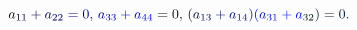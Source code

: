 \documentclass[12pt]{article}
\begin{document}
\makeatletter
\renewcommand*{\@textcolor}[3]{%
  \protect\leavevmode
  \begingroup
    \color#1{#2}#3%
  \endgroup
}
\makeatother
\begin{displaymath}
\mathcolor[RGB]{0,0,15}{a} _ { \mathcolor[RGB]{0,0,30}{1} \mathcolor[RGB]{0,0,45}{1} } \mathcolor[RGB]{0,0,60}{+} \mathcolor[RGB]{0,0,75}{a} _ { \mathcolor[RGB]{0,0,90}{2} \mathcolor[RGB]{0,0,105}{2} } \mathcolor[RGB]{0,0,120}{=} \mathcolor[RGB]{0,0,135}{0} \mathcolor[RGB]{0,0,150}{,} \mathcolor[RGB]{0,0,165}{\,
a} _ { \mathcolor[RGB]{0,0,180}{3} \mathcolor[RGB]{0,0,195}{3} } \mathcolor[RGB]{0,0,210}{+} \mathcolor[RGB]{0,0,225}{a} _ { \mathcolor[RGB]{0,0,240}{4} \mathcolor[RGB]{0,0,255}{4} } \mathcolor[RGB]{0,15,0}{=} \mathcolor[RGB]{0,15,15}{0} \mathcolor[RGB]{0,15,30}{,} \mathcolor[RGB]{0,15,45}{\,
(} \mathcolor[RGB]{0,15,60}{a} _ { \mathcolor[RGB]{0,15,75}{1} \mathcolor[RGB]{0,15,90}{3} } \mathcolor[RGB]{0,15,105}{+} \mathcolor[RGB]{0,15,120}{a} _ { \mathcolor[RGB]{0,15,135}{1} \mathcolor[RGB]{0,15,150}{4} } \mathcolor[RGB]{0,15,165}{)} \mathcolor[RGB]{0,15,180}{(} \mathcolor[RGB]{0,15,195}{a} _ { \mathcolor[RGB]{0,15,210}{3} \mathcolor[RGB]{0,15,225}{1} } \mathcolor[RGB]{0,15,240}{+} \mathcolor[RGB]{0,15,255}{a} _ { \mathcolor[RGB]{0,30,0}{3} \mathcolor[RGB]{0,30,15}{2} } \mathcolor[RGB]{0,30,30}{)} \mathcolor[RGB]{0,30,45}{=} \mathcolor[RGB]{0,30,60}{0} \mathcolor[RGB]{0,30,75}{.}
\end{displaymath}
\end{document}
